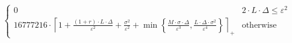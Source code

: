 \[\begin{cases} 0 & 2 \cdot L \cdot \Delta \leq \varepsilon^{2} \\ 16777216 \cdot \left\lceil 1 + \frac{\left(1 + r\right) \cdot L \cdot \Delta}{\varepsilon^{2}} + \frac{\sigma^{2}}{\varepsilon^{2}} + \min\left\{ \frac{M \cdot \sigma \cdot \Delta}{\varepsilon^{3}}, \frac{L \cdot \Delta \cdot \sigma^{2}}{\varepsilon^{4}} \right\} \right\rceil_{+} & \mathrm{otherwise} \end{cases}\]
